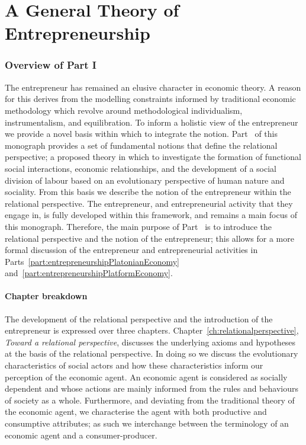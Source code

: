 \part{A General Theory of Entrepreneurship} 
\label{part:generalTheoryEntrepreneurship}

\section*{Overview of Part I}

The entrepreneur has remained an elusive character in economic theory. A reason for this derives from the modelling constraints informed by traditional economic methodology which revolve around methodological individualism, instrumentalism, and equilibration. To inform a holistic view of the entrepreneur we provide a novel basis within which to integrate the notion. Part~\ref{part:generalTheoryEntrepreneurship} of this monograph provides a set of fundamental notions that define the relational perspective; a proposed theory in which to investigate the formation of functional social interactions, economic relationships, and the development of a social division of labour based on an evolutionary perspective of human nature and sociality. From this basis we describe the notion of the entrepreneur within the relational perspective. The entrepreneur, and entrepreneurial activity that they engage in, is fully developed within this framework, and remains a main focus of this monograph. Therefore, the main purpose of Part~\ref{part:generalTheoryEntrepreneurship} is to introduce the relational perspective and the notion of the entrepreneur; this allows for a more formal discussion of the entrepreneur and entrepreneurial activities in Parts~\ref{part:entrepreneurshipPlatonianEconomy} and~\ref{part:entrepreneurshipPlatformEconomy}.

\subsection*{Chapter breakdown}

The development of the relational perspective and the introduction of the entrepreneur is expressed over three chapters. Chapter~\ref{ch:relationalperspective}, \emph{Toward a relational perspective}, discusses the underlying axioms and hypotheses at the basis of the relational perspective. In doing so we discuss the evolutionary characteristics of social actors and how these characteristics inform our perception of the economic agent. An economic agent is considered as socially dependent and whose actions are mainly informed from the rules and behaviours of society as a whole. Furthermore, and deviating from the traditional theory of the economic agent, we characterise the agent with both productive and consumptive attributes; as such we interchange between the terminology of an economic agent and a consumer-producer.

